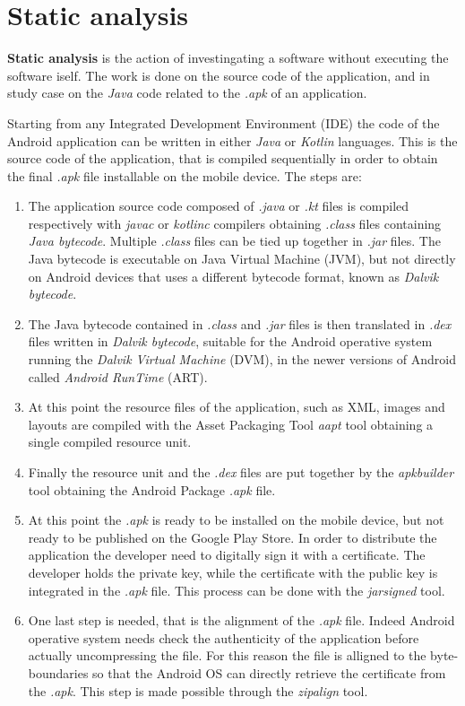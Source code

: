 	\section{Static analysis}
	\par \textbf{Static analysis} is the action of investingating a software without executing the software iself. The work is done on the source code of the application, and in study case on the \textit{Java} code related to the \textit{.apk} of an application. \newline
	\par Starting from any Integrated Development Environment (IDE) the code of the Android application can be written in either \textit{Java} or \textit{Kotlin} languages. This is the source code of the application, that is compiled sequentially in order to obtain the final \textit{.apk} file installable on the mobile device. The steps are: 
	\begin{enumerate}
		\item The application source code composed of \textit{.java} or \textit{.kt} files is compiled respectively with \textit{javac} or \textit{kotlinc} compilers obtaining \textit{.class} files containing \textit{Java bytecode}. Multiple \textit{.class} files can be tied up together in \textit{.jar} files. The Java bytecode is executable on Java Virtual Machine (JVM), but not directly on Android devices that uses a different bytecode format, known as \textit{Dalvik bytecode}. 
		\item The Java bytecode contained in \textit{.class} and \textit{.jar} files is then translated in \textit{.dex} files written in \textit{Dalvik bytecode}, suitable for the Android operative system running the \textit{Dalvik Virtual Machine} (DVM), in the newer versions of Android called \textit{Android RunTime} (ART).
		\item At this point the resource files of the application, such as XML, images and layouts are compiled with the Asset Packaging Tool \textit{aapt} tool obtaining a single compiled resource unit. 
		\item Finally the resource unit and the \textit{.dex} files are put together by the \textit{apkbuilder} tool obtaining the Android Package \textit{.apk} file.
		\item At this point the \textit{.apk} is ready to be installed on the mobile device, but not ready to be published on the Google Play Store. In order to distribute the application the developer need to digitally sign it with a certificate. The developer holds the private key, while the certificate with the public key is integrated in the \textit{.apk} file. This process can be done with the \textit{jarsigned} tool.
		\item One last step is needed, that is the alignment of the \textit{.apk} file. Indeed Android operative system needs check the authenticity of the application before actually uncompressing the file. For this reason the file is alligned to the byte-boundaries so that the Android OS can directly retrieve the certificate from the \textit{.apk}. This step is made possible through the \textit{zipalign} tool.
	\end{enumerate}
